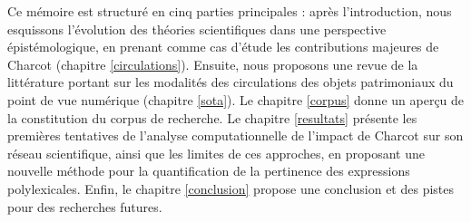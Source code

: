 Ce mémoire est structuré en cinq parties principales : après l'introduction, nous esquissons l'évolution des théories scientifiques dans une perspective épistémologique, en prenant comme cas d'étude les contributions majeures de Charcot (chapitre \ref{circulations}).
Ensuite, nous proposons une revue de la littérature portant sur les modalités des circulations des objets patrimoniaux du point de vue numérique (chapitre \ref{sota}). Le chapitre \ref{corpus} donne un aperçu de la constitution du corpus de recherche. Le chapitre \ref{resultats} présente les premières tentatives de l'analyse computationnelle de l'impact de Charcot sur son réseau scientifique, ainsi que les limites de ces approches, en proposant une nouvelle méthode pour la quantification de la pertinence des expressions polylexicales. Enfin, le chapitre \ref{conclusion} propose une conclusion et des pistes pour des recherches futures.





